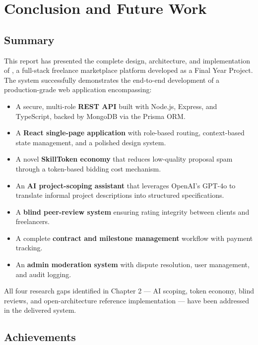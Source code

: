 \chapter{Conclusion and Future Work}

\section{Summary}

This report has presented the complete design, architecture, and implementation of \textbf{\projectname{}}, a full-stack freelance marketplace platform developed as a Final Year Project. The system successfully demonstrates the end-to-end development of a production-grade web application encompassing:

\begin{itemize}
  \item A secure, multi-role \textbf{REST API} built with Node.js, Express, and TypeScript, backed by MongoDB via the Prisma ORM.
  \item A \textbf{React single-page application} with role-based routing, context-based state management, and a polished design system.
  \item A novel \textbf{SkillToken economy} that reduces low-quality proposal spam through a token-based bidding cost mechanism.
  \item An \textbf{AI project-scoping assistant} that leverages OpenAI's GPT-4o to translate informal project descriptions into structured specifications.
  \item A \textbf{blind peer-review system} ensuring rating integrity between clients and freelancers.
  \item A complete \textbf{contract and milestone management} workflow with payment tracking.
  \item An \textbf{admin moderation system} with dispute resolution, user management, and audit logging.
\end{itemize}

All four research gaps identified in Chapter 2 --- AI scoping, token economy, blind reviews, and open-architecture reference implementation --- have been addressed in the delivered system.

\section{Achievements}

